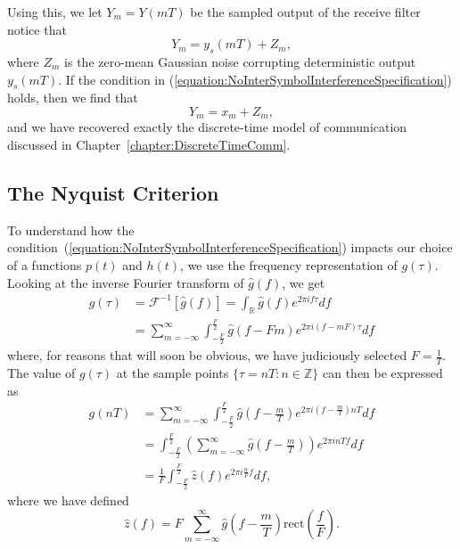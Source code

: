 Using this, we let $Y_m = Y(mT)$ be the sampled output of the receive filter notice that
\[ Y_m = y_s (mT) + Z_m, \]
where $Z_m$ is the zero-mean Gaussian noise corrupting deterministic output $y_s (mT)$.
If the condition in (\ref{equation:NoInterSymbolInterferenceSpecification}) holds, then we find that
\[ Y_m = x_m + Z_m, \]
and we have recovered exactly the discrete-time model of communication discussed in Chapter~\ref{chapter:DiscreteTimeComm}.

\subsection{The Nyquist Criterion}

To understand how the condition~(\ref{equation:NoInterSymbolInterferenceSpecification}) impacts our choice of a functions $p(t)$ and $h (t)$, we use the frequency representation of $g(\tau)$.
Looking at the inverse Fourier transform of $\hat{g}(f)$, we get
\begin{equation*}
\begin{split}
g(\tau) &= \mathcal{F}^{-1} \left[ \hat{g} (f) \right]
= \int_{\mathbb{R}} \hat{g}(f) e^{2 \pi i f \tau} df \\
&= \sum_{m = -\infty}^{\infty} \int_{-\frac{F}{2}}^{\frac{F}{2}}
\hat{g} (f - Fm) e^{2 \pi i (f - mF) \tau} df
\end{split}
\end{equation*}
where, for reasons that will soon be obvious, we have judiciously selected $F = \frac{1}{T}$.
The value of $g(\tau)$ at the sample points $\{ \tau = nT : n \in \mathbb{Z} \}$ can then be expressed as
\begin{equation} \label{equation:SamplePointsNoISI}
\begin{split}
g(nT) &= \sum_{m = -\infty}^{\infty} \int_{-\frac{F}{2}}^{\frac{F}{2}}
\hat{g} \left( f - \frac{m}{T} \right) e^{2 \pi i \left( f - \frac{m}{T} \right) nT} df \\
&= \int_{-\frac{F}{2}}^{\frac{F}{2}}
\left( \sum_{m = -\infty}^{\infty} \hat{g} \left( f - \frac{m}{T} \right) \right)
e^{2 \pi i n T f} df \\
&= \frac{1}{F} \int_{-\frac{F}{2}}^{\frac{F}{2}}
\hat{z} (f) e^{2 \pi i \frac{n}{F} f} df ,
\end{split}
\end{equation}
where we have defined
\begin{equation*}
\hat{z}(f) = F \sum_{m = -\infty}^{\infty} \hat{g} \left( f - \frac{m}{T} \right)
\mathrm{rect} \left( \frac{f}{F} \right) .
\end{equation*}

